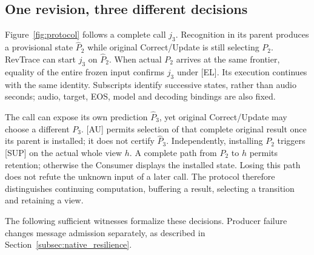 \subsection{One revision, three different decisions}
Figure~\ref{fig:protocol} follows a complete call $j_3$. Recognition in
its parent produces a provisional state $\widehat P_2$ while original
Correct/Update is still selecting $P_2$. RevTrace can start $j_3$ on
$\widehat P_2$. When actual $P_2$ arrives at the same frontier, equality
of the entire frozen input confirms $j_3$ under [EL]. Its execution
continues with the same identity. Subscripts identify successive states,
rather than audio seconds; audio, target, EOS, model and decoding bindings
are also fixed.

The call can expose its own prediction $\widehat P_3$, yet original
Correct/Update may choose a different $P_3$. [AU] permits selection of
that complete original result once its parent is installed; it does not
certify $\widehat P_3$. Independently, installing $P_2$ triggers [SUP]
on the actual whole view $h$. A complete path from $P_2$ to $h$ permits
retention; otherwise the Consumer displays the installed state. Losing
this path does not refute the unknown input of a later call. The protocol
therefore distinguishes continuing computation, buffering a result,
selecting a transition and retaining a view.

The following sufficient witnesses formalize these decisions. Producer
failure changes message admission separately, as described in
Section~\ref{subsec:native_resilience}.

